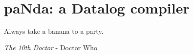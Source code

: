\chapter{paNda: a Datalog compiler}\label{chapter:panda}

\epigraph{Always take a banana to a party.}{\textit{The 10th Doctor} - Doctor Who}